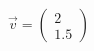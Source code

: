 \documentclass[preview]{standalone}
\begin{document}
\begin{align*}
\vec{v} = \begin{pmatrix} 2 \\ 1.5 \end{pmatrix}
\end{align*}
\end{document}
